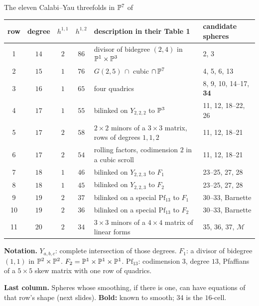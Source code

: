 \begin{frame}{The eleven Calabi--Yau threefolds in \(\mathbb P^7\) of \cite{CGKK}}
{\centering\footnotesize
\renewcommand{\arraystretch}{0.9}\setlength{\tabcolsep}{4pt}
\begin{tabular}{ccccll}
row & degree & \(h^{1,1}\) & \(h^{1,2}\) & description in their Table 1 & candidate spheres\\ \hline
1 & \(14\) & \(2\) & \(86\) & divisor of bidegree \((2,4)\) in \(\mathbb P^1\times\mathbb P^3\) & 2, 3\\
2 & \(15\) & \(1\) & \(76\) & \(G(2,5)\,\cap\) cubic \(\cap\,\mathbb P^7\) & 4, 5, 6, 13\\
3 & \(16\) & \(1\) & \(65\) & four quadrics & 8, 9, 10, 14--17, \textbf{34}\\
4 & \(17\) & \(1\) & \(55\) & bilinked on \(Y_{2,2,2}\) to \(\mathbb P^3\) & 11, 12, 18--22, 26\\
5 & \(17\) & \(2\) & \(58\) & \(2\times2\) minors of a \(3\times3\) matrix, rows of degrees \(1,1,2\) & 11, 12, 18--21\\
6 & \(17\) & \(2\) & \(54\) & rolling factors, codimension \(2\) in a cubic scroll & 11, 12, 18--21\\
7 & \(18\) & \(1\) & \(46\) & bilinked on \(Y_{2,2,3}\) to \(F_1\) & 23--25, 27, 28\\
8 & \(18\) & \(1\) & \(45\) & bilinked on \(Y_{2,2,3}\) to \(F_2\) & 23--25, 27, 28\\
9 & \(19\) & \(2\) & \(37\) & bilinked on a special \(\mathrm{Pf}_{13}\) to \(F_1\) & 30--33, Barnette\\
10 & \(19\) & \(2\) & \(36\) & bilinked on a special \(\mathrm{Pf}_{13}\) to \(F_2\) & 30--33, Barnette\\
11 & \(20\) & \(2\) & \(34\) & \(3\times3\) minors of a \(4\times4\) matrix of linear forms & 35, 36, 37, \(\boldsymbol{\mathcal M}\)
\end{tabular}\par}
{\footnotesize\textbf{Notation.} \(Y_{a,b,c}\): complete intersection of those degrees. \(F_1\): a divisor of bidegree \((1,1)\) in \(\mathbb P^2\times\mathbb P^2\). \(F_2=\mathbb P^1\times\mathbb P^1\times\mathbb P^1\). \(\mathrm{Pf}_{13}\): codimension \(3\), degree \(13\), Pfaffians of a \(5\times5\) skew matrix with one row of quadrics.
\par
\textbf{Last column.} Spheres whose smoothing, if there is one, can have equations of that row's shape (next slides). \textbf{Bold:} known to smooth; 34 is the \(16\)-cell.\par}
\end{frame}

